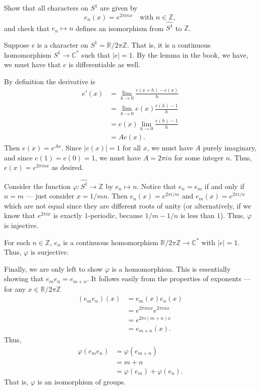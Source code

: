 \documentclass[12 pt, letterpaper]{hmcpset}
\begin{document}
\pagebreak

\begin{problem}[S \& S \S 7.3 \#5]
	Show that all characters on $S^{1}$ are given by
	\[
		e_{n}(x) = e^{2 \pi i n x} \quad \text{with } n  \in \mathbb{Z},
	\]
	and check that $e_{n} \mapsto n$ defines an isomorphism from $\widehat{S^{1}}$ to $\mathbb{Z}$.
\end{problem}

\begin{solution}
	Suppose $e$ is a character on $S^{1} = \mathbb{R} / 2 \pi \mathbb{Z}$. That is, it is a continuous homomorphism $S^{1} \to \mathbb{C}^{*}$ such that $\lvert e \rvert = 1$. By the lemma in the book, we have, we must have that $e$ is differentiable as well.

	By definition the derivative is
	\begin{align*}
		e'(x) & = \lim_{h \to 0} \frac{e(x + h) - e(x)}{h} \\
		      & = \lim_{h \to 0} e(x) \frac{e(h) - 1}{h} \\
		      & = e(x) \lim_{h \to 0} \frac{e(h) - 1}{h} \\
		      & = A e(x).
	\end{align*}
	Then $e(x) = e^{A x}$. Since $\lvert e(x) \rvert = 1$ for all $x$, we must have $A$ purely imaginary, and since $e(1) = e(0) = 1$, we must have $A = 2 \pi i n$ for some integer $n$. Thus, $e(x) = e^{2 \pi i n x}$ as desired.

	Consider the function $\varphi : \widehat{S^{1}} \to \mathbb{Z}$ by $e_{n} \mapsto n$. Notice that $e_{n} = e_{m}$ if and only if $n = m$ --- just consider $x = 1 / mn$. Then  $e_{n}(x) = e^{2 \pi i / m}$ and $e_{m}(x) = e^{2 \pi i / n}$ which are not equal since they are different roots of unity (or alternatively, if we know that $e^{2 \pi i x}$ is exactly $1$-periodic, because $1 / m - 1 / n$ is less than $1$). Thus, $\varphi$ is injective.

	For each $n \in \mathbb{Z}$, $e_{n}$ is a continuous homomorphism $\mathbb{R} / 2 \pi \mathbb{Z} \to \mathbb{C}^{*}$ with $\lvert e \rvert = 1$. Thus, $\varphi$ is surjective.

	Finally, we are only left to show $\varphi$ is a homomorphism. This is essentially showing that $e_{m} e_{n} = e_{m + n}$. It follows easily from the properties of exponents --- for any $x \in \mathbb{R} / 2 \pi \mathbb{Z}$
	\begin{align*}
		(e_{m} e_{n})(x) & = e_{m}(x) e_{n}(x) \\
				 & = e^{2 \pi i m x} e^{2 \pi i n x} \\
				 & = e^{2 \pi i (m + n) x} \\
				 & = e_{m + n}(x).
	\end{align*}
	Thus,
	\begin{align*}
		\varphi(e_{m} e_{n}) & = \varphi(e_{m + n}) \\
				     & = m + n \\
				     & = \varphi(e_{m}) + \varphi(e_{n}).
	\end{align*}
	That is, $\varphi$ is an isomorphism of groups.
\end{solution}
\end{document}
